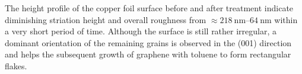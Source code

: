 The height profile of the copper foil surface before and after treatment indicate diminishing striation height and overall roughness from $\approx \SIrange{218}{64}{\nano \meter}$ within a very short period of time. Although the surface is still rather irregular, a dominant orientation of the remaining grains is observed in the (001) direction and helps the subsequent growth of graphene with toluene to form rectangular flakes.

%

